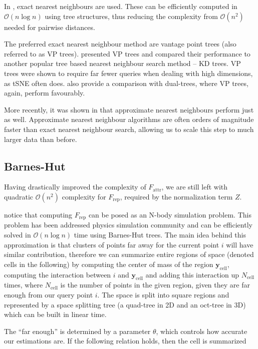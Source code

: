 \documentclass[11pt]{article}
\begin{document}
In \cite{van2014accelerating}, exact nearest neighbours are used. These can be efficiently computed in $\mathcal{O}(n \log n)$ using tree structures, thus reducing the complexity from $\mathcal{O}(n^2)$ needed for pairwise distances.

The preferred exact nearest neighbour method are vantage point trees (also referred to as VP trees). \cite{yianilos1993data} presented VP trees and compared their performance to another popular tree based nearest neighbour search method -- KD trees. VP trees were shown to require far fewer queries when dealing with high dimensions, as tSNE often does.\cite{van2014accelerating} also provide a comparison with dual-trees, where VP trees, again, perform favourably.

More recently, it was shown in \cite{linderman2017efficient} that approximate nearest neighbours perform just as well. Approximate nearest neighbour algorithms are often orders of magnitude faster than exact nearest neighbour search, allowing us to scale this step to much larger data than before.

\subsection{Barnes-Hut}

Having drastically improved the complexity of $F_\text{attr}$, we are still left with quadratic $\mathcal{O}(n^2)$ complexity for $F_\text{rep}$, required by the normalization term $Z$.

\cite{van2014accelerating} notice that computing $F_\text{rep}$ can be posed as an N-body simulation problem. This problem has been addressed physics simulation community and can be efficiently solved in $\mathcal{O}(n \log n)$ time using Barnes-Hut trees. The main idea behind this approximation is that clusters of points far away for the current point $i$ will have similar contribution, therefore we can summarize entire regions of space (denoted cells in the following) by computing the center of mass of the region $\mathbf{y}_{\text{cell}}$, computing the interaction between $i$ and $\mathbf{y}_{\text{cell}}$ and adding this interaction up $N_{\text{cell}}$ times, where $N_{\text{cell}}$ is the number of points in the given region, given they are far enough from our query point $i$. The space is split into square regions and represented by a space splitting tree (a quad-tree in 2D and an oct-tree in 3D) which can be built in linear time.

The ``far enough'' is determined by a parameter $\theta$, which controls how accurate our estimations are. If the following relation holds, then the cell is summarized
\end{document}
